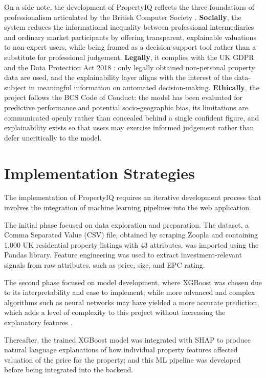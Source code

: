 On a side note, the development of PropertyIQ reflects the three foundations of professionalism articulated by the British Computer Society \parencite{BSC2022}. \textbf{Socially}, the system reduces the informational inequality between professional intermediaries and ordinary market participants by offering transparent, explainable valuations to non-expert users, while being framed as a decision-support tool rather than a substitute for professional judgement. \textbf{Legally}, it complies with the UK GDPR \parencite{GDPR2016} and the Data Protection Act 2018 \parencite{DPA2018}: only legally obtained non-personal property data are used, and the explainability layer aligns with the interest of the data-subject in meaningful information on automated decision-making. \textbf{Ethically}, the project follows the BCS Code of Conduct: the model has been evaluated for predictive performance and potential socio-geographic bias, its limitations are communicated openly rather than concealed behind a single confident figure, and explainability exists so that users may exercise informed judgement rather than defer uncritically to the model.


\section{Implementation Strategies}

The implementation of PropertyIQ requires an iterative development process that involves the integration of machine learning pipelines into the web application.

The initial phase focused on data exploration and preparation. The dataset, a Comma Separated Value (CSV) file, obtained by scraping Zoopla and containing 1,000 UK residential property listings with 43 attributes, was imported using the Pandas \parencite{Pandas2026} library. Feature engineering was used to extract investment-relevant signals from raw attributes, such as price, size, and EPC rating.

The second phase focused on model development, where XGBoost was chosen due to its interpretability and ease to implement; while more advanced and complex algorithms such as neural networks may have yielded a more accurate prediction, which adds a level of complexity to this project without increasing the explanatory features \parencite{Sharma2024}.

Thereafter, the trained XGBoost model was integrated  with SHAP to produce natural language explanations of how individual property features affected valuation of the price for the property; and this ML pipeline was developed before being integrated into the backend.

